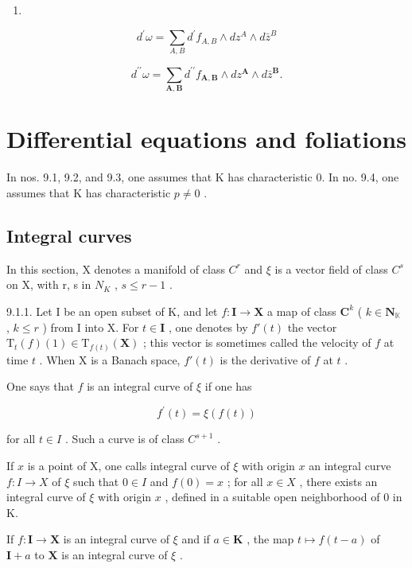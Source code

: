 \begin{enumerate}
\def\labelenumi{(\arabic{enumi})}
\setcounter{enumi}{11}
\tightlist
\item
\end{enumerate}
\[
d ^ {\prime} \omega = \sum_ {A, B} d ^ {\prime} f _ {A, B} \wedge d z ^ {A} \wedge d \bar {z} ^ {B}\tag{12}
\]

\[
d ^ {\prime \prime} \omega = \sum_ {\mathbf {A}, \mathbf {B}} d ^ {\prime \prime} f _ {\mathbf {A}, \mathbf {B}} \wedge d z ^ {\mathbf {A}} \wedge d \bar {z} ^ {\mathbf {B}}.\tag{13}
\]

\section{Differential equations and foliations}

In nos. 9.1, 9.2, and 9.3, one assumes that K has characteristic 0. In no. 9.4, one assumes that K has characteristic \(p \neq 0\) .

\subsection{Integral curves}

In this section, X denotes a manifold of class \(C^{r}\) and \(\xi\) is a vector field of class \(C^{s}\) on X, with r, s in \(N_{K}\) , \(s \leqslant r - 1\) .

9.1.1. Let I be an open subset of K, and let \(f: \mathbf{I} \to \mathbf{X}\) a map of class \(\mathbf{C}^k\) ( \(k \in \mathbf{N}_{\mathbb{K}}\) , \(k \leqslant r\) ) from I into X. For \(t \in \mathbf{I}\) , one denotes by \(f'(t)\) the vector \(\mathrm{T}_t(f)(1) \in \mathrm{T}_{f(t)}(\mathbf{X})\) ; this vector is sometimes called the velocity of \(f\) at time \(t\) . When X is a Banach space, \(f'(t)\) is the derivative of \(f\) at \(t\) .

One says that \(f\) is an integral curve of \(\xi\) if one has

\[
f ^ {\prime} (t) = \xi (f (t))\tag{1}
\]

for all \(t \in I\) . Such a curve is of class \(C^{s+1}\) .

If \(x\) is a point of X, one calls integral curve of \(\xi\) with origin \(x\) an integral curve \(f: I \to X\) of \(\xi\) such that \(0 \in I\) and \(f(0) = x\) ; for all \(x \in X\) , there exists an integral curve of \(\xi\) with origin \(x\) , defined in a suitable open neighborhood of 0 in K.

If \(f: \mathbf{I} \to \mathbf{X}\) is an integral curve of \(\xi\) and if \(a \in \mathbf{K}\) , the map \(t \mapsto f(t - a)\) of \(\mathbf{I} + a\) to \(\mathbf{X}\) is an integral curve of \(\xi\) .

